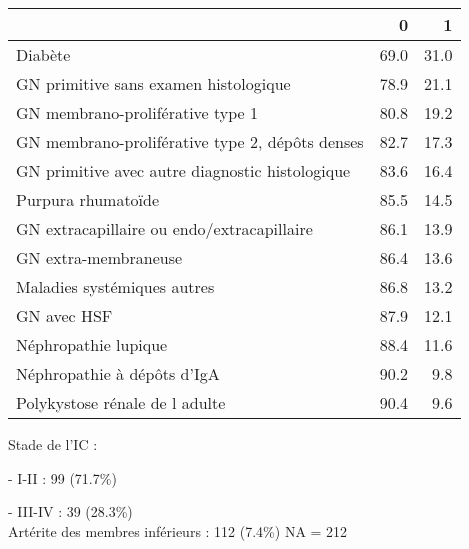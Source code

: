 \documentclass[11pt,a4paper]{article}\usepackage[]{graphicx}\usepackage[]{color}
\begin{document}
\begin{table}[H]
\centering
\begin{tabular}{lrr}
  \hline
 & 0 & 1 \\ 
  \hline
Diabète & 69.0 & 31.0 \\ 
  GN primitive sans examen histologique & 78.9 & 21.1 \\ 
  GN membrano-proliférative type 1 & 80.8 & 19.2 \\ 
  GN membrano-proliférative type 2, dépôts denses & 82.7 & 17.3 \\ 
  GN primitive avec autre diagnostic histologique & 83.6 & 16.4 \\ 
  Purpura rhumatoïde & 85.5 & 14.5 \\ 
  GN extracapillaire ou endo/extracapillaire & 86.1 & 13.9 \\ 
  GN extra-membraneuse & 86.4 & 13.6 \\ 
  Maladies systémiques autres & 86.8 & 13.2 \\ 
  GN avec HSF & 87.9 & 12.1 \\ 
  Néphropathie lupique & 88.4 & 11.6 \\ 
  Néphropathie à dépôts d'IgA & 90.2 & 9.8 \\ 
  Polykystose rénale de l adulte & 90.4 & 9.6 \\ 
   \hline
\end{tabular}
\end{table}


Stade de l’IC :

- I-II : 99 (71.7\%)

- III-IV : 39 (28.3\%)
~\\

Artérite des membres inférieurs : 112 (7.4\%) NA = 212
\end{document}
